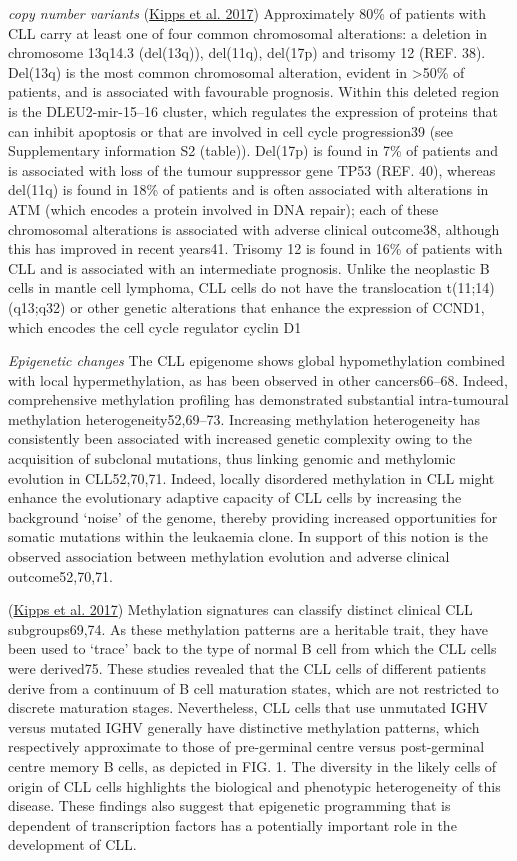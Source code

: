 \documentclass[11pt, a4paper, twosided]{book}
\begin{document}
\emph{copy number variants}
(\protect\hyperlink{ref-Kipps2017}{Kipps et al. 2017})
Approximately 80\% of patients with CLL carry at least one of four common chromosomal alterations: a deletion in chromosome 13q14.3 (del(13q)), del(11q), del(17p) and trisomy 12 (REF. 38). Del(13q) is the most common chromosomal alteration, evident in \textgreater50\% of patients, and is associated with favourable prognosis. Within this deleted region is the DLEU2-mir-15--16 cluster, which regulates the expression of proteins that can inhibit apoptosis or that are involved in cell cycle progression39 (see Supplementary information S2 (table)). Del(17p) is found in 7\% of patients and is associated with loss of the tumour suppressor gene TP53 (REF. 40), whereas del(11q) is found in 18\% of patients and is often associated with alterations in ATM (which encodes a protein involved in DNA repair); each of these chromosomal alterations is associated with adverse clinical outcome38, although this has improved in recent years41. Trisomy 12 is found in 16\% of patients with CLL and is associated with an intermediate prognosis. Unlike the neoplastic B cells in mantle cell lymphoma, CLL cells do not have the translocation t(11;14) (q13;q32) or other genetic alterations that enhance the expression of CCND1, which encodes the cell cycle regulator cyclin D1

\emph{Epigenetic changes}
The CLL epigenome shows global hypomethylation combined with local hypermethylation, as has been observed in other cancers66--68. Indeed, comprehensive methylation profiling has demonstrated substantial intra-tumoural methylation heterogeneity52,69--73. Increasing methylation heterogeneity has consistently been associated with increased genetic complexity owing to the acquisition of subclonal mutations, thus linking genomic and methylomic evolution in CLL52,70,71. Indeed, locally disordered methylation in CLL might enhance the evolutionary adaptive capacity of CLL cells by increasing the background `noise' of the genome, thereby providing increased opportunities for somatic mutations within the leukaemia clone. In support of this notion is the observed association between methylation evolution and adverse clinical outcome52,70,71.

(\protect\hyperlink{ref-Kipps2017}{Kipps et al. 2017})
Methylation signatures can classify distinct clinical CLL subgroups69,74. As these methylation patterns are a heritable trait, they have been used to `trace' back to the type of normal B cell from which the CLL cells were derived75. These studies revealed that the CLL cells of different patients derive from a continuum of B cell maturation states, which are not restricted to discrete maturation stages. Nevertheless, CLL cells that use unmutated IGHV versus mutated IGHV generally have distinctive methylation patterns, which respectively approximate to those of pre-germinal centre versus post-germinal centre memory B cells, as depicted in FIG. 1. The diversity in the likely cells of origin of CLL cells highlights the biological and phenotypic heterogeneity of this disease. These findings also suggest that epigenetic programming that is dependent of transcription factors has a potentially important role in the development of CLL.
\end{document}
